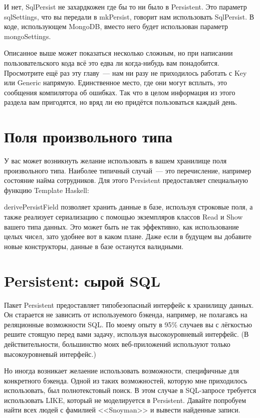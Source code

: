 И нет, SqlPersist не захардкожен где бы то ни было в Persistent. Это параметр sqlSettings, что вы передали в mkPersist, говорит нам использовать SqlPersist. В коде, использующем MongoDB, вместо него будет использован параметр mongoSettings.

Описанное выше может показаться несколько сложным, но при написании пользовательского кода всё это едва ли когда-нибудь вам понадобится. Просмотрите ещё раз эту главу~--- нам ни разу не приходилось работать с Key или Generic напрямую. Единственное место, где они могут всплыть, это сообщения компилятора об ошибках. Так что в целом информация из этого раздела вам пригодятся, но вряд ли ею придётся пользоваться каждый день.

\section{Поля произвольного типа} %

У вас может возникнуть желание использовать в вашем хранилище поля произвольного типа. Наиболее типичный случай~--- это перечисление, например состояние найма сотрудников. Для этого Persistent предоставляет специальную функцию Template Haskell:


derivePersistField позволяет хранить данные в базе, используя строковые поля, а также реализует сериализацию с помощью экземпляров классов Read и Show вашего типа данных. Это может быть не так эффективно, как использование целых чисел, зато удобнее вот в каком плане. Даже если в будущем вы добавите новые конструкторы, данные в базе останутся валидными.

\section{Persistent: сырой SQL} %

Пакет Persistent предоставляет типобезопасный интерфейс к хранилищу данных. Он старается не зависить от используемого бэкенда, например, не полагаясь на реляционные возможности SQL. По моему опыту в 95\% случаев вы с лёгкостью решите стоящую перед вами задачу, используя высокоуровневый интерфейс. (В действительности, большинство моих веб-приложений используют только высокоуровневый интерфейс.)

Но иногда возникает желаение использовать возможности, специфичные для конкретного бэкенда. Одной из таких возможностей, которую мне приходилось использовать, был полнотекстовый поиск. В этом случае в SQL-запросе требуется использовать LIKE, который не моделируется в Persistent. Давайте попробуем найти всех людей с фамилией <<Snoyman>> и вывести найденные записи.

